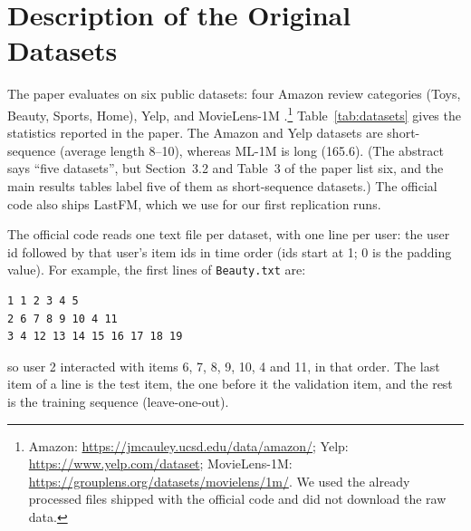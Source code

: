 \documentclass[11pt]{article}
\begin{document}
\section{Description of the Original Datasets}

The paper evaluates on six public datasets: four Amazon review categories
\citep{mcauley2015amazon} (Toys, Beauty, Sports, Home), Yelp, and
MovieLens-1M \citep{harper2015movielens}.\footnote{Amazon: \url{https://jmcauley.ucsd.edu/data/amazon/}; Yelp: \url{https://www.yelp.com/dataset}; MovieLens-1M: \url{https://grouplens.org/datasets/movielens/1m/}. We used the already processed files shipped with the official code and did not download the raw data.}
Table~\ref{tab:datasets} gives the statistics reported in the paper. The Amazon
and Yelp datasets are short-sequence (average length 8--10), whereas ML-1M is
long (165.6). (The abstract says ``five datasets'', but Section~3.2 and Table~3 of the paper list six, and the main results tables label five of them as short-sequence datasets.) The official code also ships LastFM, which we use for our first
replication runs.

\begin{table}[t]
\centering
\small
{}
\caption{Original dataset statistics reported by \citet{dang2024repeated}. $^\dagger$The data file in the official repository has 35{,}598 users, so the paper's 35{,}958 is probably a typo.}
\label{tab:datasets}
\end{table}

The official code reads one text file per dataset, with one line per user: the user id
followed by that user's item ids in time order (ids start at 1; 0 is the padding value).
For example, the first lines of \texttt{Beauty.txt} are:
\begin{verbatim}
1 1 2 3 4 5
2 6 7 8 9 10 4 11
3 4 12 13 14 15 16 17 18 19
\end{verbatim}
so user 2 interacted with items 6, 7, 8, 9, 10, 4 and 11, in that order. The last item of a line is the test
item, the one before it the validation item, and the rest is the training sequence (leave-one-out).
\end{document}

